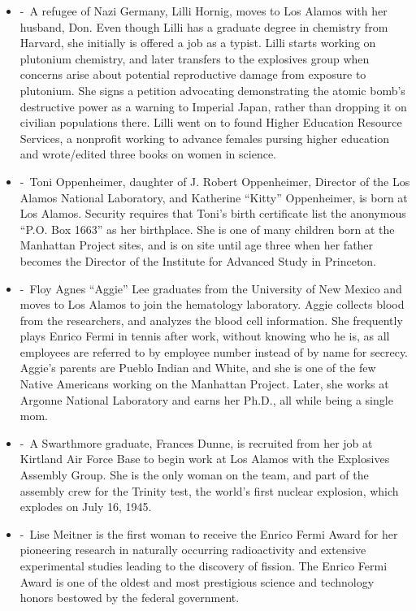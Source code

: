 \documentclass[12pt,a4paper]{article}
\begin{document}
\begin{enumerate}
\begin{itemize}
      \item[]  -\ A refugee of Nazi Germany, Lilli Hornig, moves to Los Alamos with her husband, Don. Even though Lilli has a graduate degree in chemistry from Harvard, she initially is offered a job as a typist. Lilli starts working on plutonium chemistry, and later transfers to the explosives group when concerns arise about potential reproductive damage from exposure to plutonium. She signs a petition advocating demonstrating the atomic bomb's destructive power as a warning to Imperial Japan, rather than dropping it on civilian populations there. Lilli went on to found Higher Education Resource Services, a nonprofit working to advance females pursing higher education and wrote/edited three books on women in science.
      \item[]  -\ Toni Oppenheimer, daughter of J. Robert Oppenheimer, Director of the Los Alamos National Laboratory, and Katherine ``Kitty'' Oppenheimer, is born at Los Alamos. Security requires that Toni's birth certificate list the anonymous ``P.O. Box 1663'' as her birthplace. She is one of many children born at the Manhattan Project sites, and is on site until age three when her father becomes the Director of the Institute for Advanced Study in Princeton.
      \item[]  -\ Floy Agnes ``Aggie'' Lee graduates from the University of New Mexico and moves to Los Alamos to join the hematology laboratory. Aggie collects blood from the researchers, and analyzes the blood cell information. She frequently plays Enrico Fermi in tennis after work, without knowing who he is, as all employees are referred to by employee number instead of by name for secrecy. Aggie's parents are Pueblo Indian and White, and she is one of the few Native Americans working on the Manhattan Project. Later, she works at Argonne National Laboratory and earns her Ph.D., all while being a single mom.
      \item[]  -\ A Swarthmore graduate, Frances Dunne, is recruited from her job at Kirtland Air Force Base to begin work at Los Alamos with the Explosives Assembly Group. She is the only woman on the team, and part of the assembly crew for the Trinity test, the world's first nuclear explosion, which explodes on July 16, 1945.
      \item[]  -\ Lise Meitner is the first woman to receive the Enrico Fermi Award for her pioneering research in naturally occurring radioactivity and extensive experimental studies leading to the discovery of fission. The Enrico Fermi Award is one of the oldest and most prestigious science and technology honors bestowed by the federal government. 

\end{itemize}
\end{enumerate}
\end{document}
